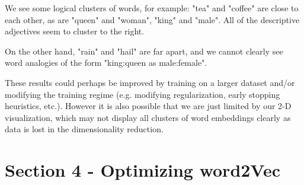 \documentclass[12pt,letterpaper]{article}
\begin{document}
We see some logical clusters of words, for example: "tea" and "coffee" are close to each other, as are "queen" and "woman", "king" and "male". All of the descriptive adjectives seem to cluster to the right.

On the other hand, "rain" and "hail" are far apart, and we cannot clearly see word analogies of the form "king:queen as male:female".

These results could perhaps be improved by training on a larger dataset and/or modifying the training regime (e.g. modifying regularization, early stopping heuristics, etc.). However it is also possible that we are just limited by our 2-D visualization, which may not display all clusters of word embeddings clearly as data is lost in the dimensionality reduction.

\section*{Section 4 - Optimizing word2Vec}
\end{document}
